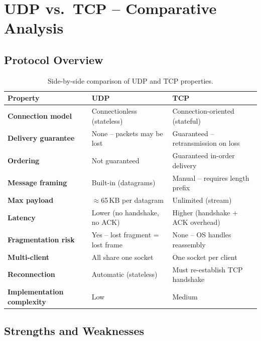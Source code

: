 \documentclass[12pt,a4paper]{article}
\begin{document}
\section{UDP vs.\ TCP -- Comparative Analysis}

\subsection{Protocol Overview}

\begin{table}[H]
\centering
\renewcommand{\arraystretch}{1.4}
\begin{tabularx}{\textwidth}{>{\bfseries}p{3.5cm} X X}
\toprule
\textbf{Property} & \textbf{UDP} & \textbf{TCP} \\
\midrule
Connection model  & Connectionless (stateless) & Connection-oriented (stateful) \\
Delivery guarantee & None -- packets may be lost & Guaranteed -- retransmission on loss \\
Ordering          & Not guaranteed & Guaranteed in-order delivery \\
Message framing   & Built-in (datagrams) & Manual -- requires length prefix \\
Max payload       & $\approx$65\,KB per datagram & Unlimited (stream) \\
Latency           & Lower (no handshake, no ACK) & Higher (handshake + ACK overhead) \\
Fragmentation risk & Yes -- lost fragment = lost frame & None -- OS handles reassembly \\
Multi-client      & All share one socket & One socket per client \\
Reconnection      & Automatic (stateless) & Must re-establish TCP handshake \\
Implementation complexity & Low & Medium \\
\bottomrule
\end{tabularx}
\caption{Side-by-side comparison of UDP and TCP properties.}
\end{table}

\subsection{Strengths and Weaknesses}
\end{document}

